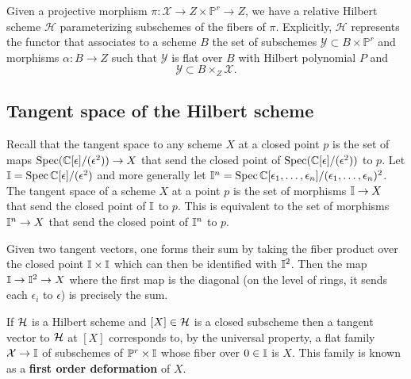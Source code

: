 \documentclass[12pt]{article}
\begin{document}
\begin{definition}
    Given a projective morphism $\pi : \mathcal{X} \to Z \times \mathbb{P}^r \to Z$, we have a relative Hilbert scheme $\mathcal{H}$ parameterizing subschemes of the fibers of $\pi$. Explicitly, $\mathcal{H}$ represents the functor that associates to a scheme $B$ the set of subschemes $\mathcal{Y} \subset B \times \mathbb{P}^r$ and morphisms $\alpha : B \to Z$ such that $\mathcal{Y}$ is flat over $B$ with Hilbert polynomial $P$ and
    \[
        \mathcal{Y} \subset B \times_{Z} \mathcal{X}.
    \]
\end{definition}

\subsection{Tangent space of the Hilbert scheme}
Recall that the tangent space to any scheme $X$ at a closed point $p$ is the set of maps $\operatorname{Spec}(\mathbb{C}[\epsilon]/(\epsilon^2)) \to X$ that send the closed point of $\operatorname{Spec}(\mathbb{C}[\epsilon]/(\epsilon^2))$ to $p$. Let $\mathbb{I} = \operatorname{Spec} \mathbb{C}[\epsilon]/(\epsilon^2)$ and more generally let $\mathbb{I}^n = \operatorname{Spec} \mathbb{C}[\epsilon_1, \ldots, \epsilon_n]/(\epsilon_1,\dots,\epsilon_n)^2$. The tangent space of a scheme $X$ at a point $p$ is the set of morphisms $\mathbb{I} \to X$ that send the closed point of $\mathbb{I}$ to $p$. This is equivalent to the set of morphisms $\mathbb{I}^n \to X$ that send the closed point of $\mathbb{I}^n$ to $p$.

Given two tangent vectors, one forms their sum by taking the fiber product over the closed point $\mathbb{I} \times \mathbb{I}$ which can then be identified with $\mathbb{I}^2$. Then the map $\mathbb{I} \to \mathbb{I}^2 \to X$ where the first map is the diagonal (on the level of rings, it sends each $\epsilon_i$ to $\epsilon$) is precisely the sum.

If ${\mathcal{H}}$ is a Hilbert scheme and $[X] \in {\mathcal{H}}$ is a closed subscheme then a tangent vector to ${\mathcal{H}}$ at $[X]$ corresponds to, by the universal property, a flat family ${\mathcal{X}} \to \mathbb{I}$ of subschemes of $\mathbb{P}^r \times \mathbb{I}$ whose fiber over $0 \in \mathbb{I}$ is $X$. This family is known as a \textbf{first order deformation } of $X$.
\end{document}
